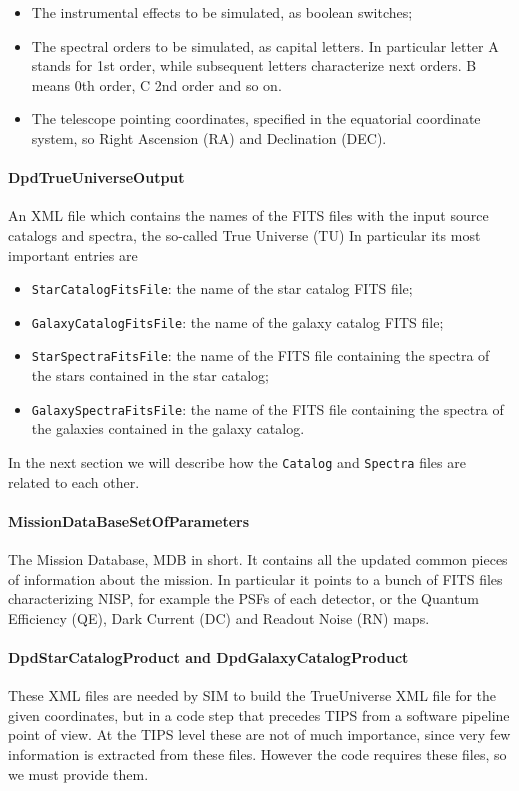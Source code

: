 \begin{itemize}
\item The instrumental effects to be simulated, as boolean switches;
\item The spectral orders to be simulated, as capital letters. In particular letter A stands for 1st order, while subsequent letters characterize next orders. B means 0th order, C 2nd order and so on.
\item The telescope pointing coordinates, specified in the equatorial coordinate system, so Right Ascension (RA) and Declination (DEC).
\end{itemize}

\paragraph{DpdTrueUniverseOutput} 
An XML file which contains the names of the FITS files with the input source catalogs and spectra, the so-called True Universe (TU) In particular its most important entries are

\begin{itemize}
\item \verb+StarCatalogFitsFile+: the name of the star catalog FITS file;
\item \verb+GalaxyCatalogFitsFile+: the name of the galaxy catalog FITS file;
\item \verb+StarSpectraFitsFile+: the name of the FITS file containing the spectra of the stars contained in the star catalog;
\item \verb+GalaxySpectraFitsFile+: the name of the FITS file containing the spectra of the galaxies contained in the galaxy catalog.
\end{itemize}

In the next section we will describe how the \verb+Catalog+ and \verb+Spectra+ files are related to each other.  

\paragraph{MissionDataBaseSetOfParameters} 
The Mission Database, MDB in short. It contains all the updated common pieces of information about the mission. In particular it points to a bunch of FITS files characterizing NISP, for example the PSFs of each detector, or the Quantum Efficiency (QE), Dark Current (DC) and Readout Noise (RN) maps.

\paragraph{DpdStarCatalogProduct and DpdGalaxyCatalogProduct} 
These XML files are needed by SIM to build the TrueUniverse XML file for the given coordinates, but in a code step that precedes TIPS from a software pipeline point of view. At the TIPS level these are not of much importance, since very few information is extracted from these files. However the code requires these files, so we must provide them.

